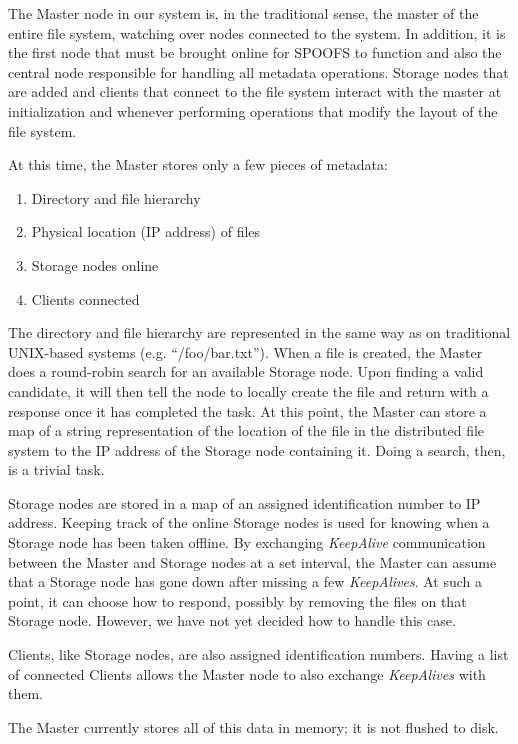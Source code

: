 The Master node in our system is, in the traditional sense, the master of the entire file system, watching over nodes connected to the system. In addition, it is the first node that must be brought online for SPOOFS to function and also the central node responsible for handling all metadata operations. Storage nodes that are added and clients that connect to the file system interact with the master at initialization and whenever performing operations that modify the layout of the file system.

At this time, the Master stores only a few pieces of metadata:
\begin{enumerate}
\item Directory and file hierarchy
\item Physical location (IP address) of files
\item Storage nodes online
\item Clients connected
\end{enumerate}
The directory and file hierarchy are represented in the same way as on traditional UNIX-based systems (e.g. ``/foo/bar.txt''). When a file is created, the Master does a round-robin search for an available Storage node. Upon finding a valid candidate, it will then tell the node to locally create the file and return with a response once it has completed the task. At this point, the Master can store a map of a string representation of the location of the file in the distributed file system to the IP address of the Storage node containing it. Doing a search, then, is a trivial task.

Storage nodes are stored in a map of an assigned identification number to IP address. Keeping track of the online Storage nodes is used for knowing when a Storage node has been taken offline. By exchanging \textit{KeepAlive} communication between the Master and Storage nodes at a set interval, the Master can assume that a Storage node has gone down after missing a few \textit{KeepAlives}. At such a point, it can choose how to respond, possibly by removing the files on that Storage node. However, we have not yet decided how to handle this case.

Clients, like Storage nodes, are also assigned identification numbers. Having a list of connected Clients allows the Master node to also exchange \textit{KeepAlives} with them. 

The Master currently stores all of this data in memory; it is not flushed to disk. 

